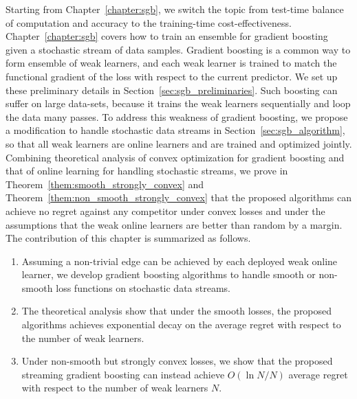 Starting from Chapter~\ref{chapter:sgb}, we switch the topic from test-time balance of computation and accuracy to the training-time cost-effectiveness. Chapter~\ref{chapter:sgb} covers how to train an ensemble for gradient boosting given a stochastic stream of data samples. Gradient boosting is a common way to form ensemble of weak learners, and each weak learner is trained to match the functional gradient of the loss with respect to the current predictor. We set up these preliminary details in Section~\ref{sec:sgb_preliminaries}. Such boosting can suffer on large data-sets, because it trains the weak learners sequentially and loop the data many passes. To address this weakness of gradient boosting, we propose a modification to handle stochastic data streams in Section~\ref{sec:sgb_algorithm}, so that all weak learners are online learners and are trained and optimized jointly. Combining theoretical analysis of convex optimization for gradient boosting and that of online learning for handling stochastic streams, we prove in Theorem~\ref{them:smooth_strongly_convex} and Theorem~\ref{them:non_smooth_strongly_convex} that the proposed algorithms can achieve no regret against any competitor under convex losses and under the assumptions that the weak online learners are better than random by a margin. 
The contribution of this chapter is summarized as follows.

\begin{enumerate}[resume]
\item Assuming a non-trivial edge can be achieved by each deployed weak online learner, we develop gradient boosting algorithms to handle smooth or non-smooth loss functions on stochastic data streams.
\item The theoretical analysis show that under the smooth losses, 
the proposed algorithms achieves exponential decay on the average regret with respect to the number of weak learners. 
\item Under non-smooth but strongly convex losses, we show that the proposed streaming gradient boosting can instead achieve $O(\ln N/N)$ average regret with respect to the number of weak learners $N$. 
\end{enumerate}

